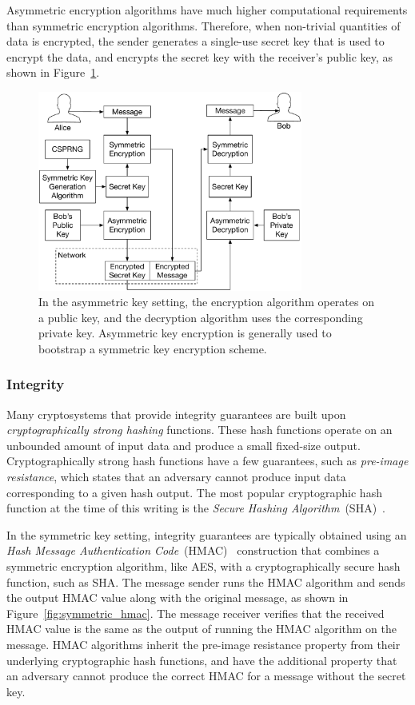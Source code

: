 Asymmetric encryption algorithms have much higher computational requirements
than symmetric encryption algorithms. Therefore, when non-trivial quantities of
data is encrypted, the sender generates a single-use secret key that is used
to encrypt the data, and encrypts the secret key with the receiver's public
key, as shown in Figure~\ref{fig:asymmetric_encryption}.

\begin{figure}[hbt]
  \centering
  \includegraphics[width=87mm]{figures/asymmetric_encryption.pdf}
  \caption{
    In the asymmetric key setting, the encryption algorithm operates on a
    public key, and the decryption algorithm uses the corresponding private
    key. Asymmetric key encryption is generally used to bootstrap a symmetric
    key encryption scheme.
  }
  \label{fig:asymmetric_encryption}
\end{figure}




\subsubsection{Integrity}

Many cryptosystems that provide integrity guarantees are built upon
\textit{cryptographically strong hashing} functions. These hash functions
operate on an unbounded amount of input data and produce a small fixed-size
output. Cryptographically strong hash functions have a few guarantees, such as
\textit{pre-image resistance}, which states that an adversary cannot produce
input data corresponding to a given hash output. The most popular cryptographic
hash function at the time of this writing is the
\textit{Secure Hashing Algorithm}~(SHA)~\cite{eastlake2001sha1}.

In the symmetric key setting, integrity guarantees are typically obtained using
an \textit{Hash Message Authentication Code}~(HMAC)~\cite{krawczyk1997hmac}
construction that combines a symmetric encryption algorithm, like AES, with a
cryptographically secure hash function, such as SHA. The message sender runs
the HMAC algorithm and sends the output HMAC value along with the original
message, as shown in Figure~\ref{fig:symmetric_hmac}. The message receiver
verifies that the received HMAC value is the same as the output of running the
HMAC algorithm on the message. HMAC algorithms inherit the pre-image resistance
property from their underlying cryptographic hash functions, and have the
additional property that an adversary cannot produce the correct HMAC for a
message without the secret key.

